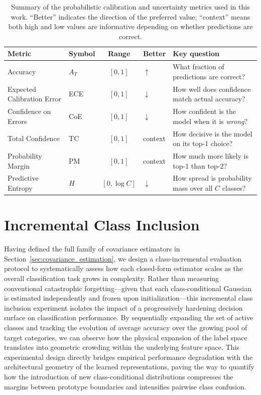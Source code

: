 \begin{table}[htb]
	\centering
	\caption{Summary of the probabilistic calibration and uncertainty metrics used in this work. ``Better'' indicates the direction of the preferred value; ``context'' means both high and low values are informative depending on whether predictions are correct.}
	\label{tab:metrics_summary}
	\scriptsize
	\setlength{\tabcolsep}{5pt}
	\renewcommand{\arraystretch}{1.25}
	\begin{tabular}{llcll}
		\toprule
		\textbf{Metric} & \textbf{Symbol} & \textbf{Range} & \textbf{Better} & \textbf{Key question} \\
		\midrule
		Accuracy                    & $A_T$  & $[0,1]$         & $\uparrow$   & What fraction of predictions are correct? \\
		Expected Calibration Error  & ECE    & $[0,1]$         & $\downarrow$ & How well does confidence match actual accuracy? \\
		Confidence on Errors        & CoE    & $[0,1]$         & $\downarrow$ & How confident is the model when it is \emph{wrong}? \\
		Total Confidence            & TC     & $[0,1]$         & context      & How decisive is the model on its top-1 choice? \\
		Probability Margin          & PM     & $[0,1]$         & context      & How much more likely is top-1 than top-2? \\
		Predictive Entropy          & $H$    & $[0, \log C]$   & $\downarrow$ & How spread is probability mass over all $C$ classes? \\
		\bottomrule
	\end{tabular}
\end{table}

\section{Incremental Class Inclusion}
\label{sec:method:incremental}

Having defined the full family of covariance estimators in Section~\ref{sec:covariance_estimation}, we design a class-incremental evaluation protocol to systematically assess how each closed-form estimator scales as the overall classification task grows in complexity. Rather than measuring conventional catastrophic forgetting—given that each class-conditional Gaussian is estimated independently and frozen upon initialization—this incremental class inclusion experiment isolates the impact of a progressively hardening decision surface on classification performance. By sequentially expanding the set of active classes and tracking the evolution of average accuracy over the growing pool of target categories, we can observe how the physical expansion of the label space translates into geometric crowding within the underlying feature space. This experimental design directly bridges empirical performance degradation with the architectural geometry of the learned representations, paving the way to quantify how the introduction of new class-conditional distributions compresses the margins between prototype boundaries and intensifies pairwise class confusion.



